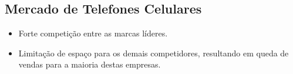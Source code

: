 \subsection{Mercado de Telefones Celulares}
\begin {itemize}
\item Forte competição entre as marcas líderes.
\item Limitação de espaço para os demais competidores, resultando em queda de vendas para a maioria destas empresas.
\end{itemize}
